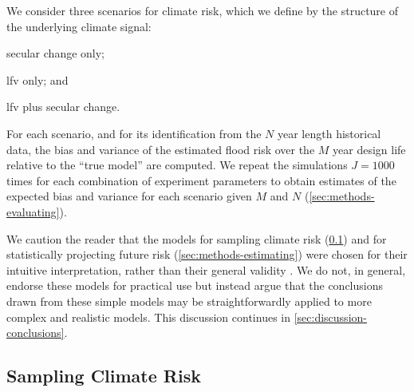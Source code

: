 \documentclass[
  draft,
  linenumbers
]{agujournal2019}
\begin{document}
We consider three scenarios for climate risk, which we define by the structure of the underlying climate signal:
\begin{enumerate*}[label= (\roman*)]
  \item secular change only;
  \item \gls{lfv} only; and
  \item \gls{lfv} plus secular change.
\end{enumerate*}
For each scenario, and for its identification from the $N$ year length historical data, the bias and variance of the estimated flood risk over the $M$ year design life relative to the ``true model'' are computed.
We repeat the simulations $J = 1000$ times for each combination of experiment parameters to obtain estimates of the expected bias and variance for each scenario given $M$ and $N$ (\cref{sec:methods-evaluating}).

We caution the reader that the models for sampling climate risk (\cref{sec:methods-generating}) and for statistically projecting future risk (\cref{sec:methods-estimating}) were chosen for their intuitive interpretation, rather than their general validity \citep[see][for a thoughtful discussion of the value of simple models]{Held:2005cj}.
We do not, in general, endorse these models for practical use but instead argue that the conclusions drawn from these simple models may be straightforwardly applied to more complex and realistic models.
This discussion continues in \cref{sec:discussion-conclusions}.

\subsection{Sampling Climate Risk}\label{sec:methods-generating}
\end{document}
